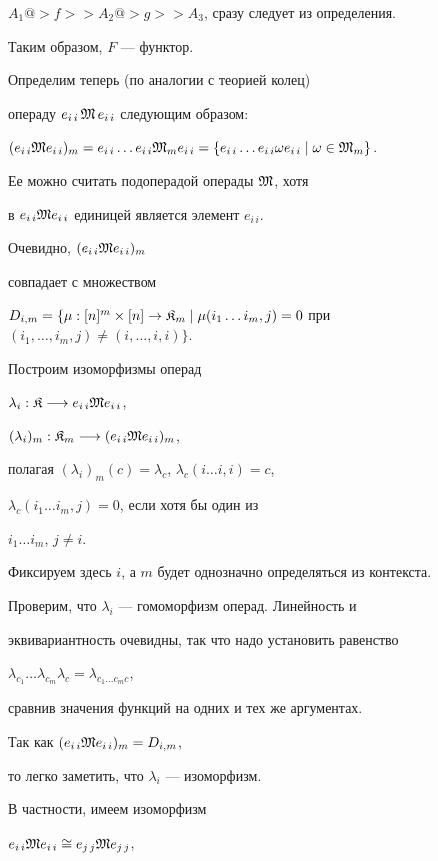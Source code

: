 \begin{pf}
$A_1@>f>> A_2@>g>> A_3$, сразу следует из определения.


Таким образом, $F$ --- функтор.





Определим теперь (по аналогии с теорией колец)


операду $e_{i\,i}\,\frak M\, e_{i\,i} $ следующим образом:


$(e_{i\,i}\frak M e_{i\,i})_m=e_{i\,i}\dotsc e_{i\,i}\frak M_m e_{i\,i}=


\{e_{i\,i}\dotsc e_{i\,i}\omega e_{i\,i}\mid \omega \in\frak M_m\}$.


Ее можно считать подоперадой операды $\frak M$, хотя


в $e_{i\,i}\frak M e_{i\,i}$ единицей является элемент $e_{i\,i}$.


Очевидно, $(e_{i\,i}\frak M e_{i\,i})_m$


совпадает с множеством


$D_{i,m}=\{ \mu : [n]^m\times [n]\to\frak K_m\mid \mu(


i_1\dotsc i_m,j)=0$ при $(i_1,\dotsc, i_m,j)\neq(i,\dotsc, i,i)\}$.


Построим изоморфизмы операд


$\lambda_i : \frak K\longrightarrow e_{i\,i}\frak M e_{i\,i}$,


$(\lambda_i)_m:\frak K_m\longrightarrow (e_{i\,i}\frak M e_{i\,i})_m$,


полагая $(\lambda_i)_m(c)=\lambda_c$, $\lambda_c(i\dotsc i,i)=c$,


$\lambda_c(i_1\dotsc i_m,j)=0$, если хотя бы один из


$i_1\dotsc i_m$, $j\ne i$.


Фиксируем здесь $i$, а $m$ будет однозначно определяться из контекста.


Проверим, что $\lambda_i$ --- гомоморфизм операд. Линейность и


эквивариантность очевидны, так что надо установить равенство


$\lambda_{c_1}\dotsc \lambda_{c_m}\lambda_c=\lambda_{c_1\dotsc c_m c}$,


сравнив значения функций на одних и тех же аргументах.


Так как $(e_{i\,i}\frak M e_{i\,i})_m=D_{i,m}$,


то легко заметить, что $\lambda_i$ --- изоморфизм.


В частности, имеем изоморфизм


$e_{i\,i}\frak M e_{i\,i}\cong e_{j\,j}\frak M e_{j\,j}$,



\end{pf}
